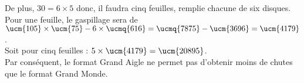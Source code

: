 \begin{enumerate}
         De plus, $30 =6\times5$ donc, il faudra cinq feuilles, remplie chacune de six disques. \\
         Pour une feuille, le gaspillage sera de $\ucm{105}\times\ucm{75}-6\times\ucmq{616} =\ucmq{7875}-\ucm{3696} =\ucm{4179}$. \\
         Soit pour cinq feuilles : $5\times\ucm{4179} =\ucm{20895}$. \\
         Par conséquent, {\blue le format Grand Aigle ne permet pas d'obtenir moins de chutes que le format Grand Monde}.
   \end{enumerate}
